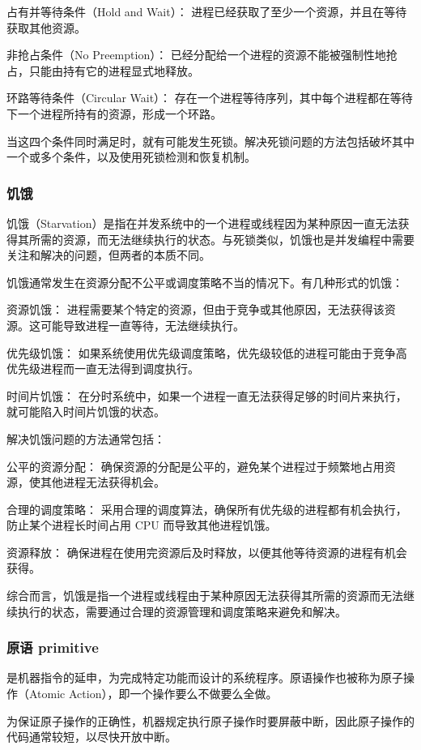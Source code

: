\documentclass{ctexart}
\begin{document}
占有并等待条件（Hold and Wait）： 进程已经获取了至少一个资源，并且在等待获取其他资源。

非抢占条件（No Preemption）： 已经分配给一个进程的资源不能被强制性地抢占，只能由持有它的进程显式地释放。

环路等待条件（Circular Wait）： 存在一个进程等待序列，其中每个进程都在等待下一个进程所持有的资源，形成一个环路。

当这四个条件同时满足时，就有可能发生死锁。解决死锁问题的方法包括破坏其中一个或多个条件，以及使用死锁检测和恢复机制。

\subsubsection{饥饿}
饥饿（Starvation）是指在并发系统中的一个进程或线程因为某种原因一直无法获得其所需的资源，而无法继续执行的状态。与死锁类似，饥饿也是并发编程中需要关注和解决的问题，但两者的本质不同。

饥饿通常发生在资源分配不公平或调度策略不当的情况下。有几种形式的饥饿：

资源饥饿： 进程需要某个特定的资源，但由于竞争或其他原因，无法获得该资源。这可能导致进程一直等待，无法继续执行。

优先级饥饿： 如果系统使用优先级调度策略，优先级较低的进程可能由于竞争高优先级进程而一直无法得到调度执行。

时间片饥饿： 在分时系统中，如果一个进程一直无法获得足够的时间片来执行，就可能陷入时间片饥饿的状态。

解决饥饿问题的方法通常包括：

公平的资源分配： 确保资源的分配是公平的，避免某个进程过于频繁地占用资源，使其他进程无法获得机会。

合理的调度策略： 采用合理的调度算法，确保所有优先级的进程都有机会执行，防止某个进程长时间占用 CPU 而导致其他进程饥饿。

资源释放： 确保进程在使用完资源后及时释放，以便其他等待资源的进程有机会获得。

综合而言，饥饿是指一个进程或线程由于某种原因无法获得其所需的资源而无法继续执行的状态，需要通过合理的资源管理和调度策略来避免和解决。

\subsubsection{原语 primitive}

是机器指令的延申，为完成特定功能而设计的系统程序。原语操作也被称为原子操作（Atomic Action），即一个操作要么不做要么全做。

为保证原子操作的正确性，机器规定执行原子操作时要屏蔽中断，因此原子操作的代码通常较短，以尽快开放中断。
\end{document}
